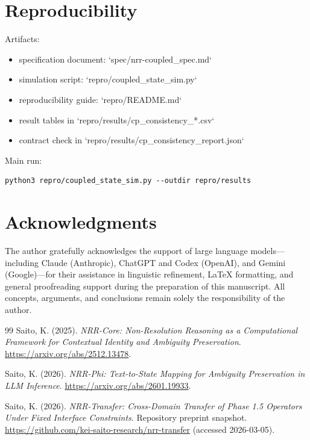 \documentclass[11pt,a4paper]{article}
\begin{document}
\section{Reproducibility}
Artifacts:
\begin{itemize}
  \item specification document: `spec/nrr-coupled\_spec.md`
  \item simulation script: `repro/coupled\_state\_sim.py`
  \item reproducibility guide: `repro/README.md`
  \item result tables in `repro/results/cp\_consistency\_*.csv`
  \item contract check in `repro/results/cp\_consistency\_report.json`
\end{itemize}

Main run:
\begin{lstlisting}
python3 repro/coupled_state_sim.py --outdir repro/results
\end{lstlisting}

\section*{Acknowledgments}

The author gratefully acknowledges the support of large language
models---including Claude (Anthropic), ChatGPT and Codex (OpenAI), and Gemini (Google)---for their assistance in linguistic refinement,
LaTeX formatting, and general proofreading support during the
preparation of this manuscript.
All concepts, arguments, and conclusions remain solely the
responsibility of the author.

\begin{thebibliography}{99}
Saito, K. (2025).
\textit{NRR-Core: Non-Resolution Reasoning as a Computational Framework for Contextual Identity and Ambiguity Preservation}.
\url{https://arxiv.org/abs/2512.13478}.

Saito, K. (2026).
\textit{NRR-Phi: Text-to-State Mapping for Ambiguity Preservation in LLM Inference}.
\url{https://arxiv.org/abs/2601.19933}.

Saito, K. (2026).
\textit{NRR-Transfer: Cross-Domain Transfer of Phase 1.5 Operators Under Fixed Interface Constraints}.
Repository preprint snapshot. \url{https://github.com/kei-saito-research/nrr-transfer} (accessed 2026-03-05).
\end{thebibliography}
\end{document}
